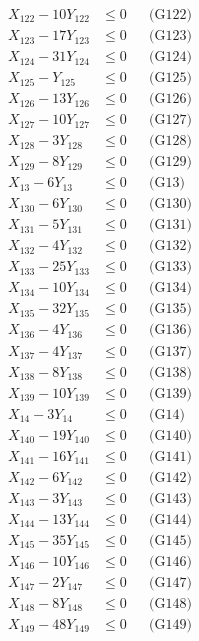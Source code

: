 \documentclass[a4paper,10pt]{article}
\begin{document}
{\begin{align}
X_{122} - 10Y_{122} &\leq 0 && \text{(G122)} \\
X_{123} - 17Y_{123} &\leq 0 && \text{(G123)} \\
X_{124} - 31Y_{124} &\leq 0 && \text{(G124)} \\
X_{125} - Y_{125} &\leq 0 && \text{(G125)} \\
X_{126} - 13Y_{126} &\leq 0 && \text{(G126)} \\
X_{127} - 10Y_{127} &\leq 0 && \text{(G127)} \\
X_{128} - 3Y_{128} &\leq 0 && \text{(G128)} \\
X_{129} - 8Y_{129} &\leq 0 && \text{(G129)} \\
X_{13} - 6Y_{13} &\leq 0 && \text{(G13)} \\
X_{130} - 6Y_{130} &\leq 0 && \text{(G130)} \\
X_{131} - 5Y_{131} &\leq 0 && \text{(G131)} \\
X_{132} - 4Y_{132} &\leq 0 && \text{(G132)} \\
X_{133} - 25Y_{133} &\leq 0 && \text{(G133)} \\
\allowbreak
X_{134} - 10Y_{134} &\leq 0 && \text{(G134)} \\
X_{135} - 32Y_{135} &\leq 0 && \text{(G135)} \\
X_{136} - 4Y_{136} &\leq 0 && \text{(G136)} \\
X_{137} - 4Y_{137} &\leq 0 && \text{(G137)} \\
X_{138} - 8Y_{138} &\leq 0 && \text{(G138)} \\
X_{139} - 10Y_{139} &\leq 0 && \text{(G139)} \\
X_{14} - 3Y_{14} &\leq 0 && \text{(G14)} \\
X_{140} - 19Y_{140} &\leq 0 && \text{(G140)} \\
X_{141} - 16Y_{141} &\leq 0 && \text{(G141)} \\
X_{142} - 6Y_{142} &\leq 0 && \text{(G142)} \\
X_{143} - 3Y_{143} &\leq 0 && \text{(G143)} \\
X_{144} - 13Y_{144} &\leq 0 && \text{(G144)} \\
X_{145} - 35Y_{145} &\leq 0 && \text{(G145)} \\
X_{146} - 10Y_{146} &\leq 0 && \text{(G146)} \\
X_{147} - 2Y_{147} &\leq 0 && \text{(G147)} \\
X_{148} - 8Y_{148} &\leq 0 && \text{(G148)} \\
X_{149} - 48Y_{149} &\leq 0 && \text{(G149)} \\

\end{align}}
\end{document}
